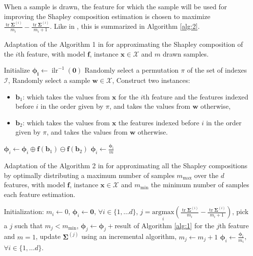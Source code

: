 \documentclass{article}
\theoremstyle{plain}
\theoremstyle{definition}
\theoremstyle{remark}
\DeclareMathOperator{\ilr}{ilr}
\DeclareMathOperator{\tr}{tr}
\begin{document}
When a sample is drawn, the feature for which the sample will be used for improving the Shapley composition estimation is chosen to maximize $\frac{\tr \bm{\Sigma}^{(i)}}{m_i} - \frac{\tr \bm{\Sigma}^{(i)}}{m_i+1}$. Like in \cite{vstrumbelj2014explaining}, this is summarized in Algorithm \ref{alg:2}.
\begin{algorithm}[tb]
   \caption{Adaptation of the Algorithm 1 in \cite{vstrumbelj2014explaining} for approximating the Shapley composition of the $i$th feature, with model $\bm{f}$, instance $\bm{x}\in\mathcal{X}$ and $m$ drawn samples.}
   \label{alg:1}
\begin{algorithmic}
   \STATE Initialize $\bm{\phi_i}\leftarrow \ilr^{-1}(\bm{0})$
   \STATE Randomly select a permutation $\pi$ of the set of indexes $\mathcal{I}$,
   \STATE Randomly select a sample $\bm{w}\in\mathcal{X}$,
   \STATE Construct two instances:
   \begin{itemize}
     \item $\bm{b}_1$: which takes the values from $\bm{x}$ for the $i$th feature and the features indexed before $i$ in the order given by $\pi$, and takes the values from $\bm{w}$ otherwise,
     \item $\bm{b}_2$: which takes the values from $\bm{x}$ the features indexed before $i$ in the order given by $\pi$, and takes the values from $\bm{w}$ otherwise.
     \end{itemize}
   \STATE $\bm{\phi}_i \leftarrow \bm{\phi}_i \oplus \bm{f}(\bm{b}_1) \ominus \bm{f}(\bm{b}_2) $
   \ENDFOR
   \STATE $\bm{\phi}_i \leftarrow \frac{\bm{\phi}_i}{m}$
\end{algorithmic}
\end{algorithm}

\begin{algorithm}[tb]
   \caption{Adaptation of the Algorithm 2 in \cite{vstrumbelj2014explaining} for approximating all the Shapley compositions by optimally distributing a maximum number of samples $m_{\text{max}}$ over the $d$ features, with model $\bm{f}$, instance $\bm{x}\in\mathcal{X}$ and $m_{\text{min}}$ the minimum number of samples each feature estimation.}
   \label{alg:2}
   \begin{algorithmic}
     \STATE Initialization: $m_{i} \leftarrow 0$, $\bm{\phi}_i \leftarrow \bm{0}$, $\forall i \in \{1, \dots d\}$,
     \STATE $j = \underset{i}{\text{argmax}} \left( \frac{\tr \bm{\Sigma}^{(i)}}{m_i} - \frac{\tr \bm{\Sigma}^{(i)}}{m_i+1} \right)$,
     \ELSE
     \STATE pick a $j$ such that $m_j < m_{\text{min}}$,
     \ENDIF
     \STATE $\bm{\phi}_j \leftarrow \bm{\phi}_j +$result of Algorithm \ref{alg:1} for the $j$th feature and $m=1$,
     \STATE update $\bm{\Sigma}^{(j)}$ using an incremental algorithm,
     \STATE $m_j \leftarrow m_j+1$
     \ENDWHILE
     \STATE $\bm{\phi}_i \leftarrow \frac{\bm{\phi}_i}{m_i}$, $\forall i \in \{1, \dots d\}$.
\end{algorithmic}
\end{algorithm}
\end{document}
